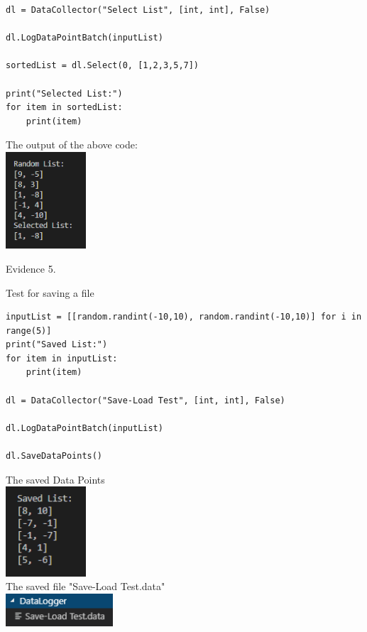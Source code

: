 \begin{flushleft}
\begin{center}
\begin{verbatim}
dl = DataCollector("Select List", [int, int], False)

dl.LogDataPointBatch(inputList)

sortedList = dl.Select(0, [1,2,3,5,7])

print("Selected List:")
for item in sortedList:
    print(item)
        \end{verbatim}
            
        The output of the above code: \\
        \includegraphics[width=3cm]{Images/Testing/T4.7.1.PNG} \\
        \vspace{1cm}

        {\large Evidence 5.\rn } \\ 
        \vspace{0.3cm}

        Test for saving a file \\
        \begin{verbatim}
inputList = [[random.randint(-10,10), random.randint(-10,10)] for i in range(5)]
print("Saved List:")
for item in inputList:
    print(item)

dl = DataCollector("Save-Load Test", [int, int], False)

dl.LogDataPointBatch(inputList)

dl.SaveDataPoints()
        \end{verbatim}

        The saved Data Points \\
        \includegraphics[width=3cm]{Images/Testing/T4.8.1.PNG} \\
        The saved file "Save-Load Test.data" \\
        \includegraphics[width=4cm]{Images/Testing/T4.8.2.PNG} \\
        \vspace{1cm}


\end{center}
\end{flushleft}

